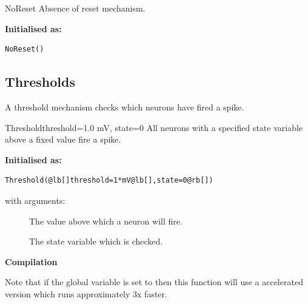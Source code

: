 \documentclass[letterpaper,10pt]{manual}
\begin{document}
\hypertarget{brian.NoReset}{}\begin{classdesc}{NoReset}{}
Absence of reset mechanism.

\textbf{Initialised as:}

\begin{Verbatim}[commandchars=@\[\]]
NoReset()
\end{Verbatim}
\end{classdesc}

\subsection{Thresholds}

A threshold mechanism checks which neurons have fired a
spike.

\hypertarget{brian.Threshold}{}\begin{classdesc}{Threshold}{threshold=1.0 mV, state=0}
All neurons with a specified state variable above a fixed value fire a spike.

\textbf{Initialised as:}

\begin{Verbatim}[commandchars=@\[\]]
Threshold(@lb[]threshold=1*mV@lb[],state=0@rb[])
\end{Verbatim}

with arguments:
\begin{description}
\item[]
The value above which a neuron will fire.

\item[]
The state variable which is checked.

\end{description}

\textbf{Compilation}

Note that if the global variable  is set to 
then this function will use a  accelerated version which
runs approximately 3x faster.
\end{classdesc}
\end{document}
